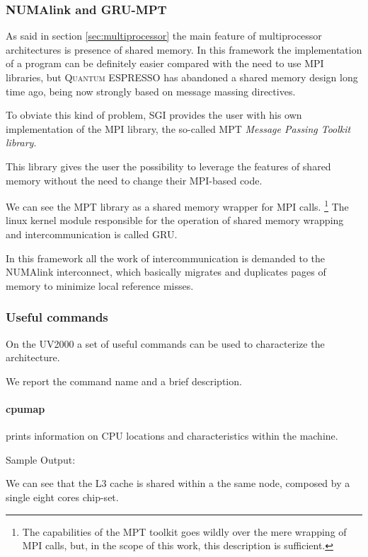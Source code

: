\documentclass[a4paper,12pt]{article}
\newcommand\QE{\textsc{Quantum} ESPRESSO }
\begin{document}
\subsubsection{NUMAlink and GRU-MPT}
As said in section \ref{sec:multiprocessor} the main feature of multiprocessor architectures is presence of shared memory.
In this framework the implementation of a program can be definitely easier compared with the need to use MPI libraries, but \QE has abandoned a shared memory design long time ago, being now strongly based on message massing directives.

To obviate this kind of problem, SGI provides the user with his own implementation of the MPI library, the so-called MPT\cite{MPT} \textit{Message Passing Toolkit library}.

This library gives the user the possibility to leverage the features of shared memory without the need to change their MPI-based code. 

We can see the MPT library as a shared memory wrapper for MPI calls. \footnote{The capabilities of the MPT toolkit goes wildly over the mere wrapping of MPI calls, but, in the scope of this work, this description is sufficient.}
The linux kernel module responsible for the operation of shared memory wrapping and intercommunication is called GRU.

In this framework all the work of intercommunication is demanded to the NUMAlink interconnect, which basically migrates and duplicates pages of memory to minimize local reference misses.


\subsubsection{Useful commands}\label{sec:UsefulCommands}
On the UV2000 a set of useful commands can be used to characterize the architecture.

We report the command name and a brief description.

\paragraph{cpumap} prints information on CPU locations and characteristics within the machine.

Sample Output: 


We can see that the L3 cache is shared within a the same node, composed by a single eight cores chip-set.
\end{document}

